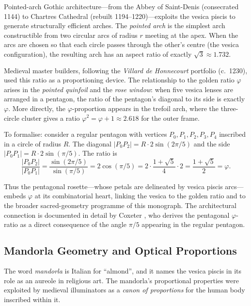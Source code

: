 Pointed-arch Gothic architecture—from the Abbey of Saint-Denis
(consecrated 1144) to Chartres Cathedral (rebuilt 1194–1220)—exploits the
vesica piscis to generate structurally efficient arches.
The \emph{pointed arch} is the simplest arch constructible from two
circular arcs of radius \(r\) meeting at the apex.
When the arcs are chosen so that each circle passes through the other's
centre (the vesica configuration), the resulting arch has an aspect ratio
of exactly \(\sqrt{3} \approx 1.732\).

Medieval master builders, following the \emph{Villard de Honnecourt}
portfolio (c.~1230), used this ratio as a proportioning device.
The relationship to the golden ratio \(\varphi\) arises in the
\emph{pointed quinfoil} and the \emph{rose window}: when five vesica
lenses are arranged in a pentagon, the ratio of the pentagon's diagonal
to its side is exactly \(\varphi\).
More directly, the \(\varphi\)-proportion appears in the trefoil arch,
where the three-circle cluster gives a ratio
\(\varphi^2 = \varphi + 1 \approx 2.618\) for the outer frame.

To formalise: consider a regular pentagon with vertices
\(P_0, P_1, P_2, P_3, P_4\) inscribed in a circle of radius \(R\).
The diagonal \(|P_0 P_2| = R \cdot 2\sin(2\pi/5)\)
and the side \(|P_0 P_1| = R \cdot 2\sin(\pi/5)\).
The ratio is
\[
  \frac{|P_0 P_2|}{|P_0 P_1|}
  = \frac{\sin(2\pi/5)}{\sin(\pi/5)}
  = 2\cos(\pi/5)
  = 2 \cdot \frac{1+\sqrt{5}}{4} \cdot 2
  = \frac{1+\sqrt{5}}{2} = \varphi.
\]

Thus the pentagonal rosette—whose petals are delineated by vesica
piscis arcs—embeds \(\varphi\) at its combinatorial heart, linking
the vesica to the golden ratio and to the broader sacred-geometry
programme of this monograph.
The architectural connection is documented in detail by Coxeter
\cite{coxeter_regular_polytopes}, who derives the pentagonal
\(\varphi\)-ratio as a direct consequence of the angle
\(\pi/5\) appearing in the regular pentagon.

\subsection{Mandorla Geometry and Optical Proportions}
\label{subsec:ch11-mandorla}

The word \emph{mandorla} is Italian for ``almond'', and it names the
vesica piscis in its role as an aureole in religious art.
The mandorla's proportional properties were exploited by medieval illuminators
as a \emph{canon of proportions} for the human body inscribed within it.

